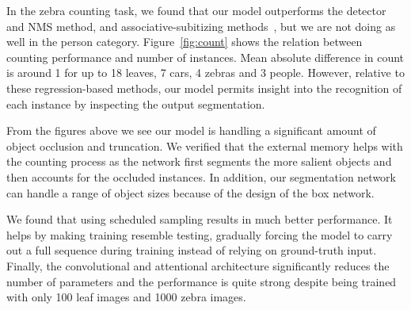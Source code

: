 In the zebra counting task, we found that our model outperforms the detector
and NMS method, and associative-subitizing methods~\cite{chattopadhyay16count},
but we are not doing as well in the person category. Figure~\ref{fig:count}
shows the relation between counting performance and number of instances. Mean
absolute difference in count is around 1 for up to 18 leaves, 7 cars, 4 zebras
and 3 people. However, relative to these regression-based methods,  our model
permits insight into the recognition of each instance by inspecting the output
segmentation.

From the figures above we see our model is handling a significant amount of
object occlusion and truncation. We verified that the external memory helps
with the counting process as the network first segments the more salient
objects and then accounts for the occluded instances. In addition, our
segmentation network can handle a range of object sizes because of the
design of the box network.

We found that using scheduled sampling results in much better performance. It
helps by making training resemble testing, gradually forcing the model
to carry out a full sequence during training instead of relying on ground-truth input. Finally, the convolutional and attentional architecture
significantly reduces the number of parameters and the performance is quite
strong despite being trained with only 100 leaf images and 1000 zebra images.



